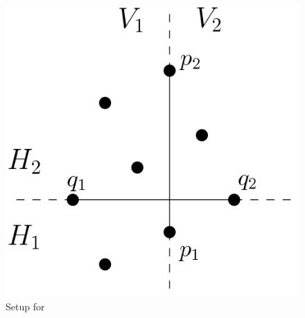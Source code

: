 \documentclass{amsart}
\theoremstyle{plain}
\theoremstyle{definition}
\begin{document}
\begin{figure}
\includegraphics[scale=.3]{setup.png}
\caption{Setup for }
\end{figure}
\end{document}
